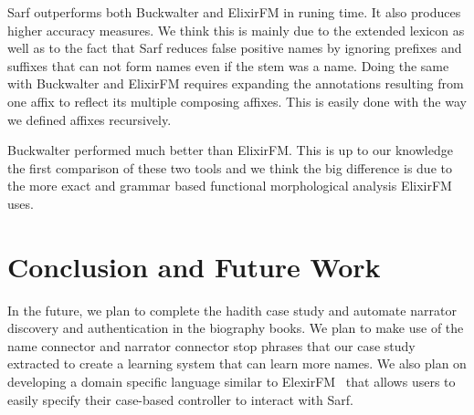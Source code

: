 \documentclass[11pt]{article}
\begin{document}
Sarf outperforms both Buckwalter and ElixirFM in runing time. 
It also produces higher accuracy measures. 
We think this is mainly due to the extended
lexicon as well as to the fact that Sarf reduces false positive
names by ignoring prefixes and suffixes that can not form
names even if the stem was a name. 
Doing the same with Buckwalter and ElixirFM requires  
expanding the annotations resulting from one affix to reflect
its multiple composing affixes.
This is easily done with the way we defined affixes recursively.

Buckwalter performed much better than ElixirFM. This is up to 
our knowledge the first comparison of these two tools and 
we think the big difference is due to the more exact 
and grammar based functional morphological analysis ElixirFM 
uses. 

\section{Conclusion and Future Work}
\label{sec:future}

In the future, we plan to complete the hadith case study 
and automate narrator discovery and authentication in the 
biography books. 
We plan to make use of the name connector and narrator
connector stop phrases that our case study extracted to create a 
learning system that can learn more names. 
We also plan on developing a domain specific language similar 
to ElexirFM~\cite{Otakar:07}
that allows users to easily specify their case-based controller
to interact with Sarf.





\end{document}
